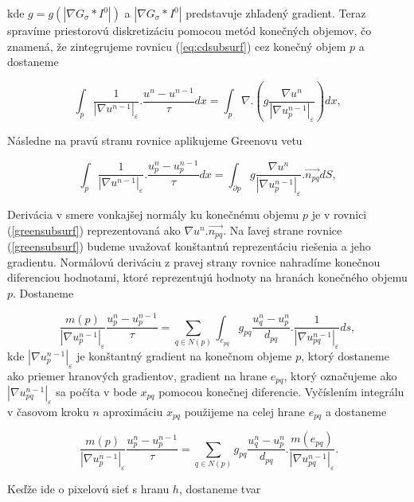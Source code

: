 \documentclass[a4paper,11pt,oneside]{article}%
\def\epsilon{\varepsilon}
\begin{document}
kde $g = g(|\nabla G_{\sigma}*I^0|)$ a $|\nabla G_{\sigma}*I^0|$ predstavuje zhľadený gradient. Teraz spravíme priestorovú diskretizáciu pomocou metód konečných objemov, čo znamená, že zintegrujeme rovnicu (\ref{eq:cdsubsurf}) cez konečný objem $p$ a dostaneme

\begin{equation}
\int_{p}\frac{1}{|\nabla u^{n-1}|_{\epsilon}}.\frac{u^n-u^{n-1}}{\tau}dx = \int_{p}\nabla.\left(g\frac{\nabla u^n}{|\nabla u_p^{n-1}|_{\epsilon}}\right)dx,
\end{equation}

Následne na pravú stranu rovnice aplikujeme Greenovu vetu

\begin{equation} \label{greensubsurf}
\int_{p}\frac{1}{|\nabla u^{n-1}|_{\epsilon}}.\frac{u_p^n-u_p^{n-1}}{\tau}dx = \int_{\partial p} g\frac{\nabla u^n}{|\nabla u_p^{n-1}|_{\epsilon}}.\vec{n_{pq}}dS,
\end{equation}

Derivácia v smere vonkajšej normály ku konečnému objemu $p$ je v rovnici (\ref{greensubsurf}) reprezentovaná ako $\nabla u^n.\vec{n_{pq}}$. Na ľavej strane rovnice (\ref{greensubsurf}) budeme uvažovať konštantnú reprezentáciu riešenia a jeho gradientu. Normálovú deriváciu z pravej strany rovnice nahradíme konečnou diferenciou hodnotami, ktoré reprezentujú hodnoty na hranách konečného objemu $p$. Dostaneme

\begin{equation}
\frac{m(p)}{|\nabla u_p^{n-1}|_{\epsilon}}\frac{u_p^n-u_p^{n-1}}{\tau} = \sum_{q \in N(p)}\int_{e_{pq}}g_{pq}\frac{u_q^n - u_p^n}{d_{pq}}.\frac{1}{|\nabla u_{pq}^{n-1}|_{\epsilon}}ds,
\end{equation}
kde $|\nabla u_p^{n-1}|_{\epsilon}$ je konštantný gradient na konečnom objeme $p$, ktorý dostaneme ako priemer hranových gradientov, gradient na hrane $e_{pq}$, ktorý označujeme ako $|\nabla u_{pq}^{n-1}|_{\epsilon}$ sa počíta v bode $x_{pq}$ pomocou konečnej diferencie. 
Vyčíslením integrálu v časovom kroku $n$ aproximáciu $x_{pq}$ použijeme na celej hrane $e_{pq}$ a dostaneme

\begin{equation} \
\frac{m(p)}{|\nabla u_p^{n-1}|_{\epsilon}}\frac{u_p^n-u_p^{n-1}}{\tau} = \sum_{q \in N(p)}g_{pq}\frac{u_q^n - u_p^n}{d_{pq}}.\frac{m(e_{pq})}{|\nabla u_{pq}^{n-1}|_{\epsilon}}.
\end{equation}

Keďže ide o pixelovú sieť s hranu $h$, dostaneme tvar
\end{document}
